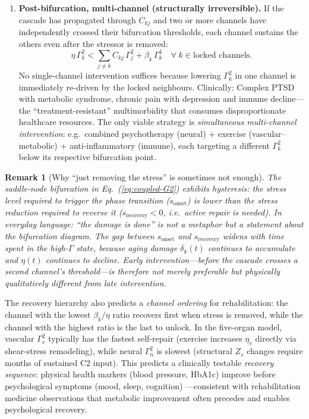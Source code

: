 \documentclass[aps,pre,twocolumn,superscriptaddress,floatfix]{revtex4-2}
\newtheorem{remark}{Remark}
\begin{document}
\begin{enumerate}
  \item \textbf{Post-bifurcation, multi-channel
    (structurally irreversible).}
    If the cascade has propagated through $C_{kj}$
    and two or more channels have independently
    crossed their bifurcation thresholds,
    each channel sustains the others even after
    the stressor is removed:
    \begin{equation}
      \eta\,\Gamma_k^2
      < \sum_{j \neq k} C_{kj}\,\Gamma_j^2
        + \beta_k\,\Gamma_k^4
      \quad \forall\; k \in \text{locked channels.}
      \label{eq:irreversible}
    \end{equation}
    No single-channel intervention suffices because
    lowering $\Gamma_k^2$ in one channel is
    immediately re-driven by the locked neighbours.
    Clinically: Complex PTSD with metabolic
    syndrome, chronic pain with depression and
    immune decline---the ``treatment-resistant''
    multimorbidity that consumes disproportionate
    healthcare resources.
    The only viable strategy is \emph{simultaneous
    multi-channel intervention}: e.g.\ combined
    psychotherapy (neural) + exercise
    (vascular--metabolic) + anti-inflammatory
    (immune), each targeting a different $\Gamma_k^2$
    below its respective bifurcation point.
\end{enumerate}

\begin{remark}[Why ``just removing the stress''
  is sometimes not enough]
\label{rem:hysteresis}
The saddle-node bifurcation in
Eq.~(\ref{eq:coupled-G2}) exhibits
\emph{hysteresis}: the stress level required to
\emph{trigger} the phase transition
($s_{\text{onset}}$) is lower than the stress
\emph{reduction} required to reverse it
($s_{\text{recovery}} < 0$, i.e.\ active repair
is needed).
In everyday language: ``the damage is done''
is not a metaphor but a statement about the
bifurcation diagram.
The gap between $s_{\text{onset}}$ and
$s_{\text{recovery}}$ widens with time spent in
the high-$\Gamma$ state, because aging damage
$\delta_k(t)$ continues to accumulate and
$\eta(t)$ continues to decline.
Early intervention---before the cascade crosses
a second channel's threshold---is therefore not
merely preferable but \emph{physically
qualitatively different} from late intervention.
\end{remark}

\noindent
The recovery hierarchy also predicts a
\emph{channel ordering} for rehabilitation:
the channel with the lowest
$\beta_k / \eta$ ratio recovers first when stress
is removed, while the channel with the highest
ratio is the last to unlock.
In the five-organ model, vascular $\Gamma_v^2$
typically has the fastest self-repair
(exercise increases $\eta_v$ directly via
shear-stress remodeling), while neural
$\Gamma_n^2$ is slowest
(structural $Z_s$ changes require months of
sustained C2 input).
This predicts a clinically testable
\emph{recovery sequence}: physical health
markers (blood pressure, HbA1c) improve before
psychological symptoms (mood, sleep, cognition)
---consistent with rehabilitation medicine
observations that metabolic improvement often
precedes and enables psychological recovery.
\end{document}
